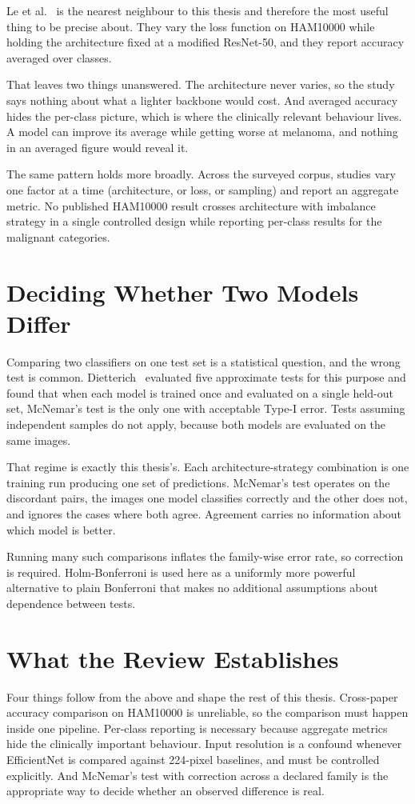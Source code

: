Le et al.~\cite{le2020classweightedfocal} is the nearest neighbour to this thesis and
therefore the most useful thing to be precise about. They vary the loss function on
HAM10000 while holding the architecture fixed at a modified ResNet-50, and they report
accuracy averaged over classes.

That leaves two things unanswered. The architecture never varies, so the study says
nothing about what a lighter backbone would cost. And averaged accuracy hides the
per-class picture, which is where the clinically relevant behaviour lives. A model can
improve its average while getting worse at melanoma, and nothing in an averaged figure
would reveal it.

The same pattern holds more broadly. Across the surveyed corpus, studies vary one factor
at a time (architecture, or loss, or sampling) and report an aggregate metric. No
published HAM10000 result crosses architecture with imbalance strategy in a single
controlled design while reporting per-class results for the malignant categories.

\section{Deciding Whether Two Models Differ}
\label{sec:lit-stats}

Comparing two classifiers on one test set is a statistical question, and the wrong test
is common. Dietterich~\cite{dietterich1998tests} evaluated five approximate tests for
this purpose and found that when each model is trained once and evaluated on a single
held-out set, McNemar's test is the only one with acceptable Type-I error. Tests
assuming independent samples do not apply, because both models are evaluated on the same
images.

That regime is exactly this thesis's. Each architecture-strategy combination is one
training run producing one set of predictions. McNemar's test operates on the discordant
pairs, the images one model classifies correctly and the other does not, and ignores the
cases where both agree. Agreement carries no information about which model is better.

Running many such comparisons inflates the family-wise error rate, so correction is
required. Holm-Bonferroni is used here as a uniformly more powerful alternative to plain
Bonferroni that makes no additional assumptions about dependence between tests.

\section{What the Review Establishes}

Four things follow from the above and shape the rest of this thesis. Cross-paper
accuracy comparison on HAM10000 is unreliable, so the comparison must happen inside one
pipeline. Per-class reporting is necessary because aggregate metrics hide the clinically
important behaviour. Input resolution is a confound whenever EfficientNet is compared
against 224-pixel baselines, and must be controlled explicitly. And McNemar's test with
correction across a declared family is the appropriate way to decide whether an observed
difference is real.
